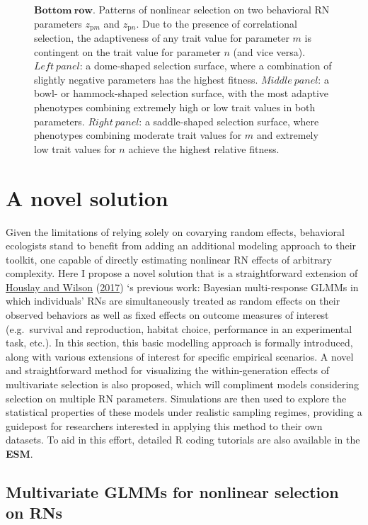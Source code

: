 \documentclass{article}
\begin{document}
\begin{figure}
{$\boldsymbol{Bottom \ row}$. Patterns of nonlinear selection on two behavioral RN parameters ${z_{\mathrm{p}m}}$ and ${z_{\mathrm{p}n}}$. Due to the presence of correlational selection, the adaptiveness of any trait value for parameter $m$ is contingent on the trait value for parameter $n$ (and vice versa). $Left \ panel$: a dome-shaped selection surface, where a combination of slightly negative parameters has the highest fitness. $Middle \ panel$: a bowl- or hammock-shaped selection surface, with the most adaptive phenotypes combining extremely high or low trait values in both parameters. $Right \ panel$: a saddle-shaped selection surface, where phenotypes combining moderate trait values for $m$ and extremely low trait values for $n$ achieve the highest relative fitness.
}
\label{fig:fig2}
\end{figure}

\hypertarget{a-novel-solution}{%
\section{A novel solution}\label{a-novel-solution}}

Given the limitations of relying solely on covarying random effects,
behavioral ecologists stand to benefit from adding an additional
modeling approach to their toolkit, one capable of directly estimating
nonlinear RN effects of arbitrary complexity. Here I propose a novel
solution that is a straightforward extension of
\protect\hyperlink{ref-Hous2017}{Houslay and Wilson}
(\protect\hyperlink{ref-Hous2017}{2017}) `s previous work: Bayesian
multi-response GLMMs in which individuals' RNs are simultaneously
treated as random effects on their observed behaviors as well as fixed
effects on outcome measures of interest (e.g.~survival and reproduction,
habitat choice, performance in an experimental task, etc.). In this
section, this basic modelling approach is formally introduced, along
with various extensions of interest for specific empirical scenarios. A
novel and straightforward method for visualizing the within-generation
effects of multivariate selection is also proposed, which will
compliment models considering selection on multiple RN parameters.
Simulations are then used to explore the statistical properties of these
models under realistic sampling regimes, providing a guidepost for
researchers interested in applying this method to their own datasets. To
aid in this effort, detailed R coding tutorials are also available in
the \textbf{ESM}.

\hypertarget{multivariate-glmms-for-nonlinear-selection-on-rns}{%
\subsection{Multivariate GLMMs for nonlinear selection on
RNs}\label{multivariate-glmms-for-nonlinear-selection-on-rns}}
\end{document}
